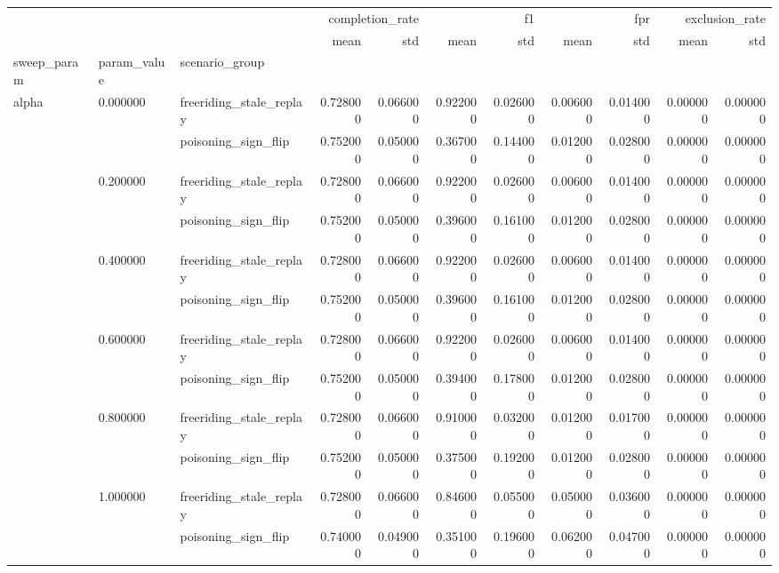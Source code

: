\begin{tabular}{lllrrrrrrrr}
\toprule
 &  &  & \multicolumn{2}{r}{completion_rate} & \multicolumn{2}{r}{f1} & \multicolumn{2}{r}{fpr} & \multicolumn{2}{r}{exclusion_rate} \\
 &  &  & mean & std & mean & std & mean & std & mean & std \\
sweep_param & param_value & scenario_group &  &  &  &  &  &  &  &  \\
\midrule
\multirow[t]{12}{*}{alpha} & \multirow[t]{2}{*}{0.000000} & freeriding_stale_replay & 0.728000 & 0.066000 & 0.922000 & 0.026000 & 0.006000 & 0.014000 & 0.000000 & 0.000000 \\
 &  & poisoning_sign_flip & 0.752000 & 0.050000 & 0.367000 & 0.144000 & 0.012000 & 0.028000 & 0.000000 & 0.000000 \\
\cline{2-11}
 & \multirow[t]{2}{*}{0.200000} & freeriding_stale_replay & 0.728000 & 0.066000 & 0.922000 & 0.026000 & 0.006000 & 0.014000 & 0.000000 & 0.000000 \\
 &  & poisoning_sign_flip & 0.752000 & 0.050000 & 0.396000 & 0.161000 & 0.012000 & 0.028000 & 0.000000 & 0.000000 \\
\cline{2-11}
 & \multirow[t]{2}{*}{0.400000} & freeriding_stale_replay & 0.728000 & 0.066000 & 0.922000 & 0.026000 & 0.006000 & 0.014000 & 0.000000 & 0.000000 \\
 &  & poisoning_sign_flip & 0.752000 & 0.050000 & 0.396000 & 0.161000 & 0.012000 & 0.028000 & 0.000000 & 0.000000 \\
\cline{2-11}
 & \multirow[t]{2}{*}{0.600000} & freeriding_stale_replay & 0.728000 & 0.066000 & 0.922000 & 0.026000 & 0.006000 & 0.014000 & 0.000000 & 0.000000 \\
 &  & poisoning_sign_flip & 0.752000 & 0.050000 & 0.394000 & 0.178000 & 0.012000 & 0.028000 & 0.000000 & 0.000000 \\
\cline{2-11}
 & \multirow[t]{2}{*}{0.800000} & freeriding_stale_replay & 0.728000 & 0.066000 & 0.910000 & 0.032000 & 0.012000 & 0.017000 & 0.000000 & 0.000000 \\
 &  & poisoning_sign_flip & 0.752000 & 0.050000 & 0.375000 & 0.192000 & 0.012000 & 0.028000 & 0.000000 & 0.000000 \\
\cline{2-11}
 & \multirow[t]{2}{*}{1.000000} & freeriding_stale_replay & 0.728000 & 0.066000 & 0.846000 & 0.055000 & 0.050000 & 0.036000 & 0.000000 & 0.000000 \\
 &  & poisoning_sign_flip & 0.740000 & 0.049000 & 0.351000 & 0.196000 & 0.062000 & 0.047000 & 0.000000 & 0.000000 \\

\end{tabular}
